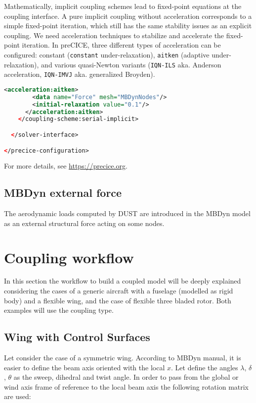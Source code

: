 Mathematically, implicit coupling schemes lead to fixed-point equations at the coupling interface. A pure implicit coupling without acceleration corresponds to a simple fixed-point iteration, which still has the same stability issues as an explicit coupling. We need acceleration techniques to stabilize and accelerate the fixed-point iteration. 
In preCICE, three different types of acceleration can be configured: constant (\texttt{constant} under-relaxation), \texttt{aitken} (adaptive under-relaxation), and various quasi-Newton variants (\texttt{IQN-ILS} aka. Anderson acceleration, \texttt{IQN-IMVJ} aka. generalized Broyden).
\begin{lstlisting}[language=XML]
      <acceleration:aitken>
        <data name="Force" mesh="MBDynNodes"/>
        <initial-relaxation value="0.1"/>
      </acceleration:aitken>		
    </coupling-scheme:serial-implicit>

  </solver-interface>

</precice-configuration>
\end{lstlisting}

For more details, see \url{https://precice.org}.
\subsection{MBDyn external force}
The aerodynamic loads computed by DUST are introduced in the MBDyn model as an external structural force acting on some nodes.

\section{Coupling workflow}
In this section the workflow to build a coupled model will be deeply explained considering the cases of a generic aircraft with a fuselage (modelled as rigid body) and a flexible wing, and the case of flexible three bladed rotor. 
Both examples will use the  coupling type. 

\subsection{Wing with Control Surfaces}
Let consider the case of a symmetric wing. According to MBDyn manual, it is easier to define the beam axis oriented with the local $x$. Let define the angles $\lambda$, $\delta$, $\theta$ as the sweep, dihedral and twist angle. In order to pass from the global or wind axis frame of reference to the local beam axis the following rotation matrix are used: 

